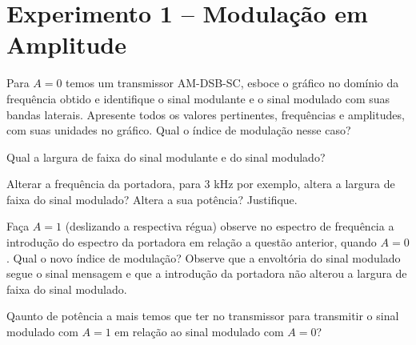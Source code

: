 \documentclass[12pt,addpoints]{exam}
\begin{document}
\section*{Experimento 1 -- Modulação em Amplitude}

\begin{questions}
    \question Para $A = 0$ temos um transmissor AM-DSB-SC, esboce o gráfico no domínio da frequência obtido e identifique o sinal modulante e o sinal modulado com suas bandas laterais. Apresente todos os valores pertinentes, frequências e amplitudes, com suas unidades no gráfico. Qual o índice de modulação nesse caso?
    \makeemptybox{5cm}
    
    \question Qual a largura de faixa do sinal modulante e do sinal modulado?
    \fillwithlines{0.25in}

    \question Alterar a frequência da portadora, para 3 kHz por exemplo, altera a largura de faixa do sinal modulado? Altera a sua potência? Justifique.
    \fillwithlines{0.5in}

    \question Faça $A = 1$ (deslizando a respectiva régua) observe no espectro de frequência a introdução do espectro da portadora  em relação a questão anterior, quando $A=0$. Qual o novo índice de modulação? Observe que a envoltória do sinal modulado segue o sinal mensagem e que a introdução da portadora não alterou a largura de faixa do sinal modulado. %
    \fillwithlines{0.5in}


    \question Qaunto de potência a mais temos que ter no transmissor para transmitir o sinal modulado com $A=1$ em relação ao sinal modulado com $A=0$?
    \fillwithlines{0.5in}

    
    

\end{questions}
\end{document}

